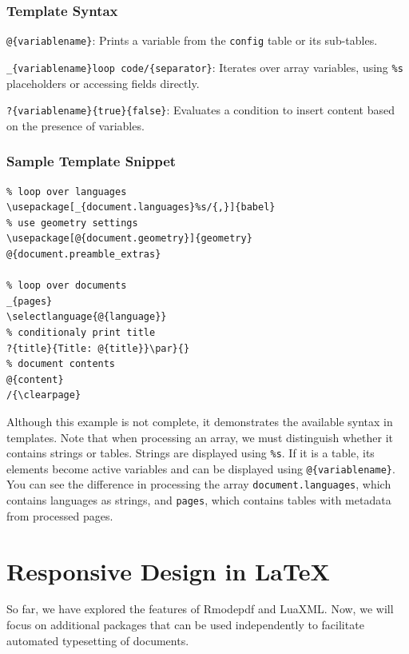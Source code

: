 \begin{frame}[fragile]
\frametitle{Template Syntax}
\begin{description}
  \item[Variable Printing] \verb|@{variablename}|: Prints a variable from the \verb|config| table or its sub-tables.
  
  \item[Loops] \verb|_{variablename}loop code/{separator}|: Iterates over array variables, using \verb|%s| placeholders or accessing fields directly.
  
  \item[Conditions] \verb|?{variablename}{true}{false}|: Evaluates a condition to insert content based on the presence of variables.
\end{description}

\end{frame}

\begin{frame}[fragile]
  \frametitle{Sample Template Snippet}
\begin{verbatim}
% loop over languages
\usepackage[_{document.languages}%s/{,}]{babel}
% use geometry settings
\usepackage[@{document.geometry}]{geometry}
@{document.preamble_extras}

% loop over documents
_{pages}
\selectlanguage{@{language}}
% conditionaly print title
?{title}{Title: @{title}}\par}{}
% document contents
@{content}
/{\clearpage}

\end{verbatim}
\end{frame}

Although this example is not complete, it demonstrates the available syntax in templates.
Note that when processing an array, we must distinguish whether it contains
strings or tables. Strings are displayed using \verb|%s|. If it is a table, its
elements become active variables and can be displayed using
\verb|@{variablename}|. You can see the difference in processing the array
\verb|document.languages|, which contains languages as strings, and
\verb|pages|, which contains tables with metadata from processed pages.



\section{Responsive Design in \LaTeX}


So far, we have explored the features of Rmodepdf and LuaXML. Now, we will
focus on additional packages that can be used independently to facilitate
automated typesetting of documents.

